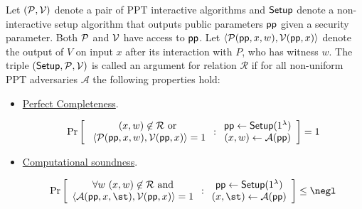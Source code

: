 \begin{definition} \label{def:argument}
Let $(\mathcal{P}, \mathcal{V})$ denote a pair of PPT interactive algorithms and $\textsf{{Setup}}$ denote a non-interactive setup algorithm that outputs public parameters $\textsf{pp}$ given a security parameter. Both $\mathcal{P}$ and $\mathcal{V}$ have access to $\textsf{pp}$. Let $\langle \mathcal{P}(\textsf{pp}, x, w), \mathcal{V}(\textsf{pp}, x) \rangle$ denote the output of $V$ on input $x$ after its interaction with $P$, who has witness $w$. The triple $(\textsf{{Setup}}, \mathcal{P}, \mathcal{V})$ is called an argument for relation $\mathcal{R}$ if for all non-uniform PPT adversaries $\mathcal{A}$ the following properties hold: 

\begin{itemize}
\item \underline{Perfect Completeness}. 
\begin{small}
\[
\Pr \left[
\begin{array}{c}
        (x, w) \not \in  \mathcal{R} \ \text{or} \\
         \ \langle \mathcal{P}(\textsf{pp}, x, w), \mathcal{V}(\textsf{pp}, x) \rangle = 1 \\
\end{array}
:
\begin{array}{c}
             \textsf{pp} \leftarrow \textsf{{Setup}}(1^\lambda) \\
             (x, w) \leftarrow \mathcal{A}(\textsf{pp}) \\
\end{array} 
\right]  = 1 
 \]
 \end{small}

\item \underline{Computational soundness}. 
\begin{small}
\[
\Pr \left[
\begin{array}{c}
        \forall w \ (x, w) \not\in  \mathcal{R} \ \text{and} \\ 
         \langle \mathcal{A}(\params, x, \st), \verifier(\params, x) \rangle = 1 
\end{array}
:
\begin{array}{c}
             \params \leftarrow \textsf{Setup}(1^\lambda) \\
             (x, \st) \leftarrow \mathcal{A}(\params) \\
\end{array}
        \right] \leq \negl
\]
\end{small}
\end{itemize} 
\end{definition} 

